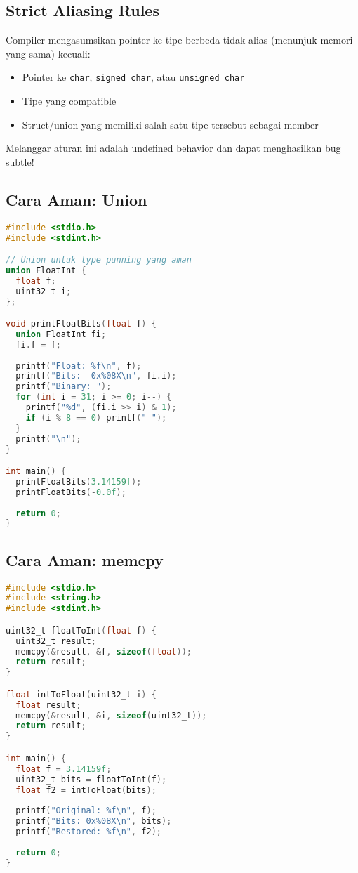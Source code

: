 \documentclass[../main.tex]{subfiles}
\begin{document}
\subsection{Strict Aliasing Rules}
Compiler mengasumsikan pointer ke tipe berbeda tidak alias (menunjuk memori yang sama) kecuali:
\begin{itemize}
  \item Pointer ke \texttt{char}, \texttt{signed char}, atau \texttt{unsigned char}
  \item Tipe yang compatible
  \item Struct/union yang memiliki salah satu tipe tersebut sebagai member
\end{itemize}

Melanggar aturan ini adalah undefined behavior dan dapat menghasilkan bug subtle!

\subsection{Cara Aman: Union}
\begin{lstlisting}[language=C, caption={Type punning dengan union}]
#include <stdio.h>
#include <stdint.h>

// Union untuk type punning yang aman
union FloatInt {
  float f;
  uint32_t i;
};

void printFloatBits(float f) {
  union FloatInt fi;
  fi.f = f;
  
  printf("Float: %f\n", f);
  printf("Bits:  0x%08X\n", fi.i);
  printf("Binary: ");
  for (int i = 31; i >= 0; i--) {
    printf("%d", (fi.i >> i) & 1);
    if (i % 8 == 0) printf(" ");
  }
  printf("\n");
}

int main() {
  printFloatBits(3.14159f);
  printFloatBits(-0.0f);
  
  return 0;
}
\end{lstlisting}

\subsection{Cara Aman: memcpy}
\begin{lstlisting}[language=C, caption={Type punning dengan memcpy}]
#include <stdio.h>
#include <string.h>
#include <stdint.h>

uint32_t floatToInt(float f) {
  uint32_t result;
  memcpy(&result, &f, sizeof(float));
  return result;
}

float intToFloat(uint32_t i) {
  float result;
  memcpy(&result, &i, sizeof(uint32_t));
  return result;
}

int main() {
  float f = 3.14159f;
  uint32_t bits = floatToInt(f);
  float f2 = intToFloat(bits);
  
  printf("Original: %f\n", f);
  printf("Bits: 0x%08X\n", bits);
  printf("Restored: %f\n", f2);
  
  return 0;
}
\end{lstlisting}
\end{document}
